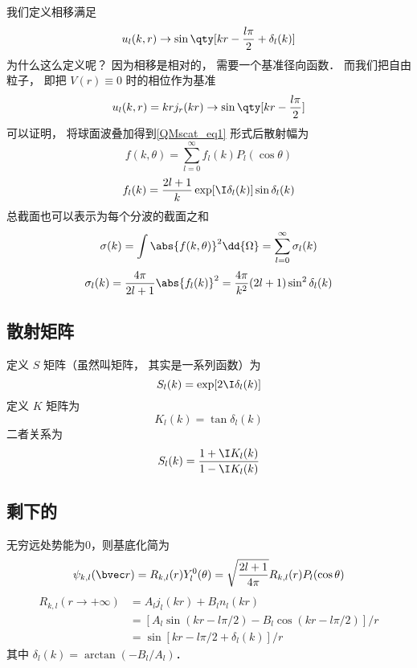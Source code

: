 我们定义相移满足
\begin{equation}
u_l(k, r) \to \sin\qty[kr - \frac{l\pi}{2} + \delta_l(k)]
\end{equation}
为什么这么定义呢？ 因为相移是相对的， 需要一个基准径向函数． 而我们把自由粒子， 即把 $V(r) \equiv 0$ 时的相位作为基准
\begin{equation}
u_l(k, r) = kr j_r(kr) \to \sin\qty[kr - \frac{l\pi}{2}]
\end{equation}
可以证明， 将球面波叠加得到\autoref{QMscat_eq1} 形式后散射幅为
\begin{equation}
f(k, \theta) = \sum_{l=0}^\infty f_l(k) P_l(\cos\theta)
\end{equation}
\begin{equation}
f_l(k) = \frac{2l+1}{k} \exp[\I\delta_l(k)] \sin\delta_l (k)
\end{equation}
总截面也可以表示为每个分波的截面之和
\begin{equation}
\sigma(k) = \int \abs{f(k,\theta)}^2 \dd{\Omega} = \sum_{l=0}^\infty \sigma_l(k)
\end{equation}
\begin{equation}
\sigma_l(k) = \frac{4\pi}{2l+1} \abs{f_l(k)}^2 = \frac{4\pi}{k^2} (2l + 1) \sin^2 \delta_l(k)
\end{equation}

\subsection{散射矩阵}
定义 $S$ 矩阵（虽然叫矩阵， 其实是一系列函数）为
\begin{equation}
S_l(k) = \exp[2\I\delta_l(k)]
\end{equation}
定义 $K$ 矩阵为
\begin{equation}
K_l(k) = \tan \delta_l(k)
\end{equation}
二者关系为
\begin{equation}
S_l(k) = \frac{1 + \I K_l(k)}{1 - \I K_l(k)}
\end{equation}

\subsection{剩下的}

无穷远处势能为0，则基底化简为
\begin{equation}
\psi_{k,l}(\bvec r) = R_{k,l}(r) Y_l^0(\theta ) = \sqrt{\frac{2l + 1}{4\pi }} R_{k,l}(r) P_l(\cos\theta)
\end{equation}
\begin{equation}\label{ParWav_eq6}
\begin{aligned}
R_{k,l}(r \to + \infty) &= A_l j_l(kr) + B_l n_l(kr) \\
&= [A_l\sin(kr - l\pi /2) - B_l\cos(kr - l\pi /2)]/r \\
&= \sin [kr - l\pi /2 + \delta_l(k)]/r
\end{aligned}
\end{equation}
其中 $\delta_l(k) = \arctan(- B_l/A_l)$．

